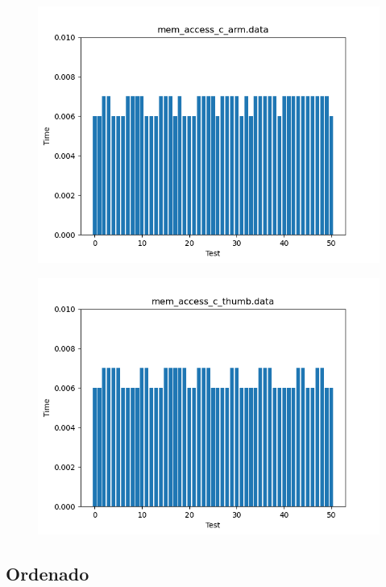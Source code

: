 \documentclass[a4paper,10pt]{article}
\begin{document}
\begin{figure}[H]
 \includegraphics[width=\linewidth]{data/mem_access_c_arm.png}
\end{figure}

\begin{figure}[H]
 \includegraphics[width=\linewidth]{data/mem_access_c_thumb.png}
\end{figure}


\subsection*{Ordenado}
\end{document}

